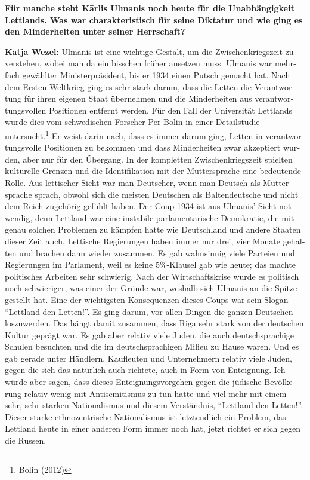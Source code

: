 \begin{otherlanguage}{ngerman}
\textbf{Für manche steht Kārlis Ulmanis noch heute für die Unabhängigkeit Lettlands. Was war charakteristisch für seine Diktatur und wie ging es den Minderheiten unter seiner Herrschaft?} 

\textbf{Katja Wezel:} Ulmanis ist eine wichtige Gestalt, um die Zwischenkriegszeit zu verstehen, wobei man da ein bisschen früher ansetzen muss. Ulmanis war mehrfach gewählter Ministerpräsident, bis er 1934 einen Putsch gemacht hat. Nach dem Ersten Weltkrieg ging es sehr stark darum, dass die Letten die Verantwortung für ihren eigenen Staat übernehmen und die Minderheiten aus verantwortungsvollen Positionen entfernt werden. Für den Fall der Universität Lettlands wurde dies vom schwedischen Forscher Per Bolin in einer Detailstudie untersucht.\footnote{Bolin (2012)} Er weist darin nach, dass es immer darum ging, Letten in verantwortungsvolle Positionen zu bekommen und dass Minderheiten zwar akzeptiert wurden, aber nur für den Übergang. 
In der kompletten Zwischenkriegszeit spielten kulturelle Grenzen und die Identifikation mit der Muttersprache eine bedeutende Rolle. Aus lettischer Sicht war man Deutscher, wenn man Deutsch als Muttersprache sprach, obwohl sich die meisten Deutschen als Baltendeutsche und nicht dem Reich zugehörig gefühlt haben. 
Der Coup 1934 ist aus Ulmanis' Sicht notwendig, denn Lettland war eine instabile parlamentarische Demokratie, die mit genau solchen Problemen zu kämpfen hatte wie Deutschland und andere Staaten dieser Zeit auch. Lettische Regierungen haben immer nur drei, vier Monate gehalten und brachen dann wieder zusammen. Es gab wahnsinnig viele Parteien und Regierungen im Parlament, weil es keine 5\%-Klausel gab wie heute; das machte politisches Arbeiten sehr schwierig. Nach der Wirtschaftskrise wurde es politisch noch schwieriger, was einer der Gründe war, weshalb sich Ulmanis an die Spitze gestellt hat. Eine der wichtigsten Konsequenzen dieses Coups war sein Slogan "`Lettland den Letten!"'. Es ging darum, vor allen Dingen die ganzen Deutschen loszuwerden. Das hängt damit zusammen, dass Riga sehr stark von der deutschen Kultur geprägt war. Es gab aber relativ viele Juden, die auch deutschsprachige Schulen besuchten und die im deutschsprachigen Milieu zu Hause waren. Und es gab gerade unter Händlern, Kaufleuten und Unternehmern relativ viele Juden, gegen die sich das natürlich auch richtete, auch in Form von Enteignung. Ich würde aber sagen, dass dieses Enteignungsvorgehen gegen die jüdische Bevölkerung relativ wenig mit Antisemitismus zu tun hatte und viel mehr mit einem sehr, sehr starken Nationalismus und diesem Verständnis, "`Lettland den Letten!"'. Dieser starke ethnozentrische Nationalismus ist letztendlich ein Problem, das Lettland heute in einer anderen Form immer noch hat, jetzt richtet er sich gegen die Russen. 


\end{otherlanguage}

